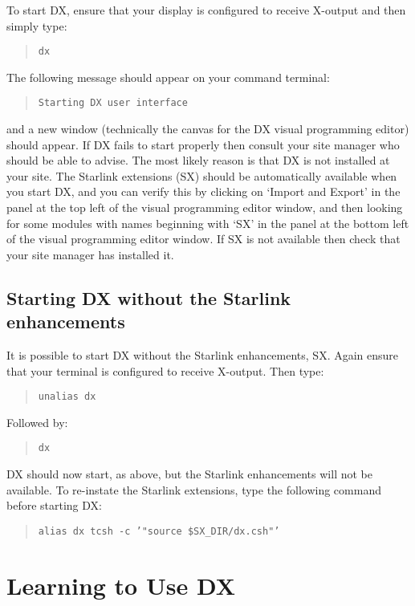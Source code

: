 To start DX, ensure that your display is configured to receive X-output
and then simply type:

\begin{quote}
{\tt dx}
\end{quote}

The following message should appear on your command terminal:

\begin{quote}
{\tt Starting DX user interface}
\end{quote}

and a new window (technically the canvas for the DX visual programming
editor) should appear. If DX fails to start properly then consult your
site manager who should be able to advise. The most likely reason is
that DX is not installed at your site. The Starlink extensions (SX) 
should be automatically available when you start DX, and you can verify
this by clicking on `Import and Export' in the panel at the top left of
the visual programming editor window, and then looking for some modules
with names beginning with `SX' in the panel at the bottom left of the
visual programming editor window. If SX is not available then check that
your site manager has installed it.

\subsection{Starting DX without the Starlink enhancements}

It is possible to start DX without the Starlink enhancements, SX. Again
ensure that your terminal is configured to receive X-output. Then
type:

\begin{quote}
{\tt unalias \quad dx}
\end{quote}

Followed by:

\begin{quote}
{\tt dx}
\end{quote}

DX should now start, as above, but the Starlink enhancements will not
be available.  To re-instate the Starlink extensions, type the following
command before starting DX:

\begin{quote}
{\tt alias dx tcsh -c '"source \$SX\_DIR/dx.csh"'}
\end{quote}

\section{Learning to Use DX  }

